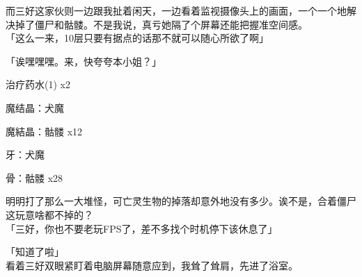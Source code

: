 而三好这家伙则一边跟我扯着闲天，一边看着监视摄像头上的画面，一个一个地解决掉了僵尸和骷髅。不是我说，真亏她隔了个屏幕还能把握准空间感。\\

「这么一来，10层只要有据点的话那不就可以随心所欲了啊」

「诶嘿嘿嘿。来，快夸夸本小姐？」\\

\cardline

  治疗药水(1) x2

  魔结晶：犬魔

  魔結晶：骷髅 x12

  牙：犬魔

  骨：骷髅 x28

\cardline

明明打了那么一大堆怪，可亡灵生物的掉落却意外地没有多少。诶不是，合着僵尸这玩意啥都不掉的？\\

「三好，你也不要老玩FPS了，差不多找个时机停下该休息了」

「知道了啦」\\

看着三好双眼紧盯着电脑屏幕随意应到，我耸了耸肩，先进了浴室。\\
